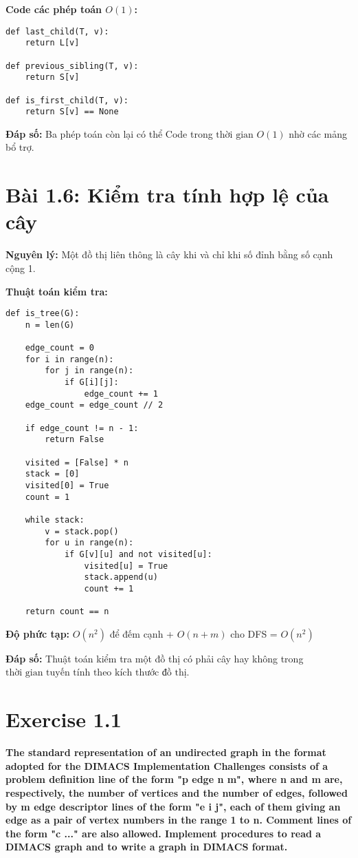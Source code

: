 \documentclass[12pt]{article}
\begin{document}
\textbf{Code các phép toán $O(1)$:}

\begin{lstlisting}
def last_child(T, v):
    return L[v]

def previous_sibling(T, v):  
    return S[v]

def is_first_child(T, v):
    return S[v] == None  
\end{lstlisting}

\textbf{Đáp số:} Ba phép toán còn lại có thể Code trong $\boxed{\text{thời gian } O(1)}$ nhờ các mảng bổ trợ.

\section{Bài 1.6: Kiểm tra tính hợp lệ của cây}

\textbf{Nguyên lý:} Một đồ thị liên thông là cây khi và chỉ khi số đỉnh bằng số cạnh cộng 1.

\textbf{Thuật toán kiểm tra:}

\begin{lstlisting}
def is_tree(G):
    n = len(G)  
    
    edge_count = 0
    for i in range(n):
        for j in range(n):
            if G[i][j]:
                edge_count += 1
    edge_count = edge_count // 2  
    
    if edge_count != n - 1:
        return False
    
    visited = [False] * n
    stack = [0] 
    visited[0] = True
    count = 1
    
    while stack:
        v = stack.pop()
        for u in range(n):
            if G[v][u] and not visited[u]:
                visited[u] = True
                stack.append(u)
                count += 1
    
    return count == n
\end{lstlisting}

\textbf{Độ phức tạp:} $O(n^2)$ để đếm cạnh + $O(n+m)$ cho DFS = $O(n^2)$

\textbf{Đáp số:} Thuật toán kiểm tra một đồ thị có phải cây hay không trong $\boxed{\text{thời gian tuyến tính theo kích thước đồ thị}}$.
\section{Exercise 1.1}
\textbf{The standard representation of an undirected graph in the format adopted for the DIMACS Implementation Challenges consists of a problem definition line of the form "p edge n m", where n and m are, respectively, the number of vertices and the number of edges, followed by m edge descriptor lines of the form "e i j", each of them giving an edge as a pair of vertex numbers in the range 1 to n. Comment lines of the form "c ..." are also allowed. Implement procedures to read a DIMACS graph and to write a graph in DIMACS format.}
\end{document}
